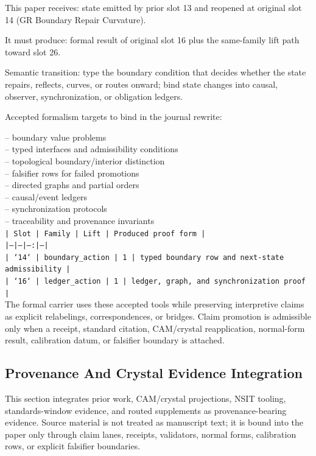 \documentclass[11pt]{article}
\begin{document}
This paper receives: state emitted by prior slot 13 and reopened at original slot 14 (GR Boundary Repair Curvature).

It must produce: formal result of original slot 16 plus the same-family lift path toward slot 26.

Semantic transition: type the boundary condition that decides whether the state repairs, reflects, curves, or routes onward; bind state changes into causal, observer, synchronization, or obligation ledgers.

Accepted formalism targets to bind in the journal rewrite:

\noindent{}-- boundary value problems\\
\noindent{}-- typed interfaces and admissibility conditions\\
\noindent{}-- topological boundary/interior distinction\\
\noindent{}-- falsifier rows for failed promotions\\
\noindent{}-- directed graphs and partial orders\\
\noindent{}-- causal/event ledgers\\
\noindent{}-- synchronization protocols\\
\noindent{}-- traceability and provenance invariants\\

\noindent\texttt{| Slot | Family | Lift | Produced proof form |}\\
\noindent\texttt{|---|---|---:|---|}\\
\noindent\texttt{| `14` | boundary\_action | 1 | typed boundary row and next-state admissibility |}\\
\noindent\texttt{| `16` | ledger\_action | 1 | ledger, graph, and synchronization proof |}\\

The formal carrier uses these accepted tools while preserving interpretive
claims as explicit relabelings, correspondences, or bridges. Claim promotion is admissible only when a receipt, standard citation,
CAM/crystal reapplication, normal-form result, calibration datum, or falsifier
boundary is attached.

\subsection*{Provenance And Crystal Evidence Integration}

This section integrates prior work, CAM/crystal projections, NSIT tooling,
standards-window evidence, and routed supplements as provenance-bearing
evidence. Source material is not treated as manuscript text; it is bound into
the paper only through claim lanes, receipts, validators, normal forms,
calibration rows, or explicit falsifier boundaries.
\end{document}
